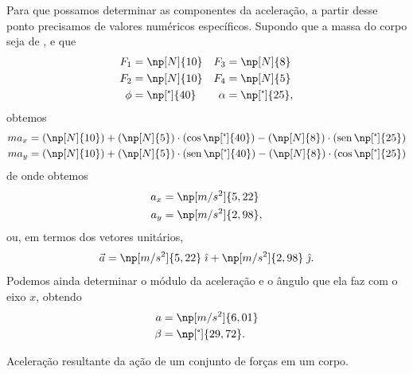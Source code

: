 Para que possamos determinar as componentes da aceleração, a partir desse ponto precisamos de valores numéricos específicos. Supondo que a massa do corpo seja de , e que
\begin{align*}
    F_1 &= \np[N]{10} & F_3 &= \np[N]{8} \\
    F_2 &= \np[N]{10} & F_4 &= \np[N]{5} \\
    \phi &= \np[\tcdegree]{40} & \alpha &= \np[\tcdegree]{25},
\end{align*}
%
obtemos
\begin{align}
    m a_x &= (\np[N]{10}) + (\np[N]{5})\cdot(\cos \np[\tcdegree]{40}) - (\np[N]{8})\cdot(\sen \np[\tcdegree]{25}) \\
    m a_y &= (\np[N]{10}) + (\np[N]{5})\cdot(\sen \np[\tcdegree]{40}) - (\np[N]{8})\cdot(\cos \np[\tcdegree]{25})
\end{align}
%
de onde obtemos
\begin{align}
    a_x &= \np[m/s^2]{5,22}\\
    a_y &= \np[m/s^2]{2,98},
\end{align}
%
ou, em termos dos vetores unitários,
\begin{equation}
    \vec{a} = \np[m/s^2]{5,22} \;\versi + \np[m/s^2]{2,98} \;\versj.
\end{equation}
%
Podemos ainda determinar o módulo da aceleração e o ângulo que ela faz com o eixo $x$, obtendo
\begin{align}
    a &= \np[m/s^2]{6,01}\\
    \beta &= \np[\tcdegree]{29,72}.
\end{align}

\begin{marginfigure}[-2cm]
\centering
{}
\caption{Aceleração resultante da ação de um conjunto de forças em um corpo.\label{Fig:CorpoSujeitoForcasNaoEquilibrioRefAcel}}
\end{marginfigure}

